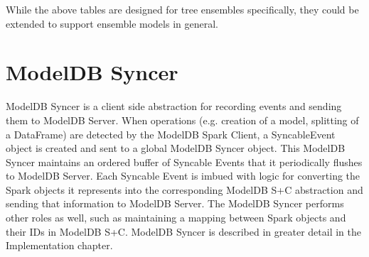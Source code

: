 While the above tables are designed for tree ensembles specifically, they could be
extended to support ensemble models in general.

\section{ModelDB Syncer}
ModelDB Syncer is a client side abstraction for recording events and sending them
to ModelDB Server. When operations (e.g. creation of a model, splitting of a DataFrame)
are detected by the ModelDB Spark Client, a SyncableEvent object is created and sent to
a global ModelDB Syncer object. This ModelDB Syncer maintains an ordered buffer of Syncable Events
that it periodically flushes to ModelDB Server. Each Syncable Event is imbued with logic for converting
the Spark objects it represents into the corresponding ModelDB S+C abstraction and sending that information to
ModelDB Server. The ModelDB Syncer performs other roles as well, such as maintaining a mapping between Spark
objects and their IDs in ModelDB S+C. ModelDB Syncer is described in greater detail in the Implementation chapter.
